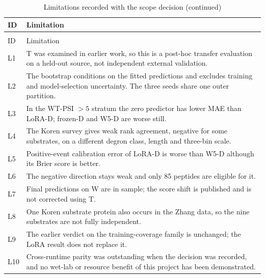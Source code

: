 
{\small
\begin{longtable}{P{0.8cm}P{12.2cm}}
\caption{Limitations recorded with the scope decision}\label{tab:transfer-limits}\\
\toprule ID & Limitation \\
\midrule\endfirsthead
\caption[]{Limitations recorded with the scope decision (continued)}\\
\toprule ID & Limitation \\
\midrule\endhead
L1 & T was examined in earlier work, so this is a post-hoc transfer evaluation on a held-out source, not independent external validation. \\
L2 & The bootstrap conditions on the fitted predictions and excludes training and model-selection uncertainty. The three seeds share one outer partition. \\
L3 & In the WT-PSI $>5$ stratum the zero predictor has lower MAE than LoRA-D; frozen-D and W5-D are worse still. \\
L4 & The Koren survey gives weak rank agreement, negative for some substrates, on a different degron class, length and three-bin scale. \\
L5 & Positive-event calibration error of LoRA-D is worse than W5-D although its Brier score is better. \\
L6 & The negative direction stays weak and only 85 peptides are eligible for it. \\
L7 & Final predictions on W are in sample; the score shift is published and is not corrected using T. \\
L8 & One Koren substrate protein also occurs in the Zhang data, so the nine substrates are not fully independent. \\
L9 & The earlier verdict on the training-coverage family is unchanged; the LoRA result does not replace it. \\
L10 & Cross-runtime parity was outstanding when the decision was recorded, and no wet-lab or resource benefit of this project has been demonstrated. \\
\bottomrule
\end{longtable}}
